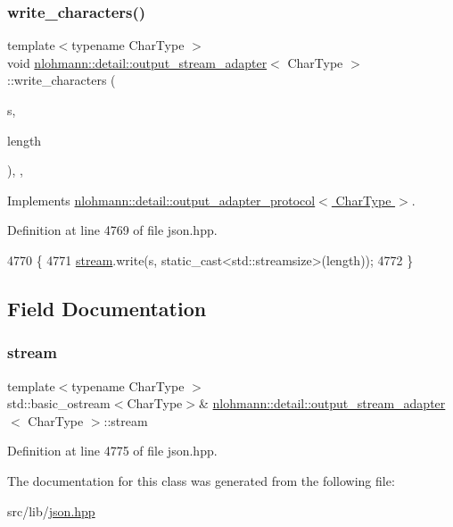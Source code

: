 \subsubsection{\texorpdfstring{write\+\_\+characters()}{write\_characters()}}
{\footnotesize\ttfamily template$<$typename Char\+Type $>$ \\
void \hyperlink{classnlohmann_1_1detail_1_1output__stream__adapter}{nlohmann\+::detail\+::output\+\_\+stream\+\_\+adapter}$<$ Char\+Type $>$\+::write\+\_\+characters (\begin{DoxyParamCaption}\item[{const Char\+Type $\ast$}]{s,  }\item[{std\+::size\+\_\+t}]{length }\end{DoxyParamCaption})\hspace{0.3cm}{\ttfamily [inline]}, {\ttfamily [override]}, {\ttfamily [virtual]}}



Implements \hyperlink{structnlohmann_1_1detail_1_1output__adapter__protocol_a2f410a164e0eda17cf6561114b0eee4a}{nlohmann\+::detail\+::output\+\_\+adapter\+\_\+protocol$<$ Char\+Type $>$}.



Definition at line 4769 of file json.\+hpp.


\begin{DoxyCode}
4770     \{
4771         \hyperlink{classnlohmann_1_1detail_1_1output__stream__adapter_aacc26af02e1e5a988bc5dbfb723b5562}{stream}.write(s, static\_cast<std::streamsize>(length));
4772     \}
\end{DoxyCode}


\subsection{Field Documentation}
\mbox{\label{classnlohmann_1_1detail_1_1output__stream__adapter_aacc26af02e1e5a988bc5dbfb723b5562}} 
\subsubsection{\texorpdfstring{stream}{stream}}
{\footnotesize\ttfamily template$<$typename Char\+Type $>$ \\
std\+::basic\+\_\+ostream$<$Char\+Type$>$\& \hyperlink{classnlohmann_1_1detail_1_1output__stream__adapter}{nlohmann\+::detail\+::output\+\_\+stream\+\_\+adapter}$<$ Char\+Type $>$\+::stream\hspace{0.3cm}{\ttfamily [private]}}



Definition at line 4775 of file json.\+hpp.



The documentation for this class was generated from the following file\+:\begin{DoxyCompactItemize}
\item 
src/lib/\hyperlink{json_8hpp}{json.\+hpp}\end{DoxyCompactItemize}

